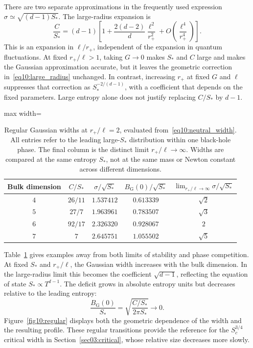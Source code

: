 \documentclass[11pt,letterpaper]{article}
\theoremstyle{plain}
\theoremstyle{definition}
\theoremstyle{remark}
\begin{document}
There are two separate approximations in the frequently used expression $\sigma\simeq\sqrt{(d-1)S_*}$. The large-radius expansion is
\begin{equation}
 \frac{C}{S_*}
 =(d-1)\left[1+\frac{2(d-2)}{d}\frac{\ell^2}{r_+^2}
 +O\!\left(\frac{\ell^4}{r_+^4}\right)\right].
 \label{eq10:large_radius}
\end{equation}
This is an expansion in $\ell/r_+$, independent of the expansion in quantum fluctuations. At fixed $r_+/\ell>1$, taking $G\to0$ makes $S_*$ and $C$ large and makes the Gaussian approximation accurate, but it leaves the geometric correction in~\eqref{eq10:large_radius} unchanged. In contrast, increasing $r_+$ at fixed $G$ and $\ell$ suppresses that correction as $S_*^{-2/(d-1)}$, with a coefficient that depends on the fixed parameters. Large entropy alone does not justify replacing $C/S_*$ by $d-1$.

\begin{table}[t]
 \centering
 \caption{Regular Gaussian widths at $r_+/\ell=2$, evaluated from~\eqref{eq10:neutral_width}. All entries refer to the leading large-$S_*$ distribution within one black-hole phase. The final column is the distinct limit $r_+/\ell\to\infty$. Widths are compared at the same entropy $S_*$, not at the same mass or Newton constant across different dimensions.}
 \label{tab10:dimensions}
 \begin{adjustbox}{max width=\textwidth}
 \begin{tabular}{@{}ccccc@{}}
 \toprule
 Bulk dimension & $C/S_*$ & $\sigma/\sqrt{S_*}$ & $B_{\mathrm G}(0)/\sqrt{S_*}$ & $\lim_{r_+/\ell\to\infty}\sigma/\sqrt{S_*}$\\
 \midrule
 $4$ & $26/11$ & $1.537412$ & $0.613339$ & $\sqrt2$\\
 $5$ & $27/7$ & $1.963961$ & $0.783507$ & $\sqrt3$\\
 $6$ & $92/17$ & $2.326320$ & $0.928067$ & $2$\\
 $7$ & $7$ & $2.645751$ & $1.055502$ & $\sqrt5$\\
 \bottomrule
 \end{tabular}
 \end{adjustbox}
\end{table}

Table~\ref{tab10:dimensions} gives examples away from both limits of stability and phase competition. At fixed $S_*$ and $r_+/\ell$, the Gaussian width increases with the bulk dimension. In the large-radius limit this becomes the coefficient $\sqrt{d-1}$, reflecting the equation of state $S_*\propto T^{d-1}$. The deficit grows in absolute entropy units but decreases relative to the leading entropy:
\begin{equation}
 \frac{B_{\mathrm G}(0)}{S_*}
 =\sqrt{\frac{C/S_*}{2\pi S_*}}
 \longrightarrow0.
 \label{eq10:relative_width}
\end{equation}
Figure~\ref{fig10:regular} displays both the geometric dependence of the width and the resulting profile. These regular transitions provide the reference for the $S_c^{3/4}$ critical width in Section~\ref{sec03:critical}, whose relative size decreases more slowly.
\end{document}
